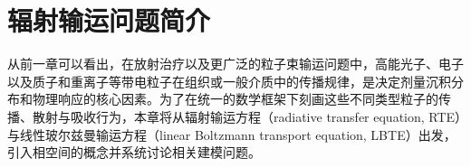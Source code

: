 \section{辐射输运问题简介}

从前一章可以看出，在放射治疗以及更广泛的粒子束输运问题中，高能光子、电子以及质子和重离子等带电粒子在组织或一般介质中的传播规律，是决定剂量沉积分布和物理响应的核心因素。为了在统一的数学框架下刻画这些不同类型粒子的传播、散射与吸收行为，本章将从辐射输运方程（radiative transfer equation, RTE）与线性玻尔兹曼输运方程（linear Boltzmann transport equation, LBTE）出发，引入相空间的概念并系统讨论相关建模问题。






